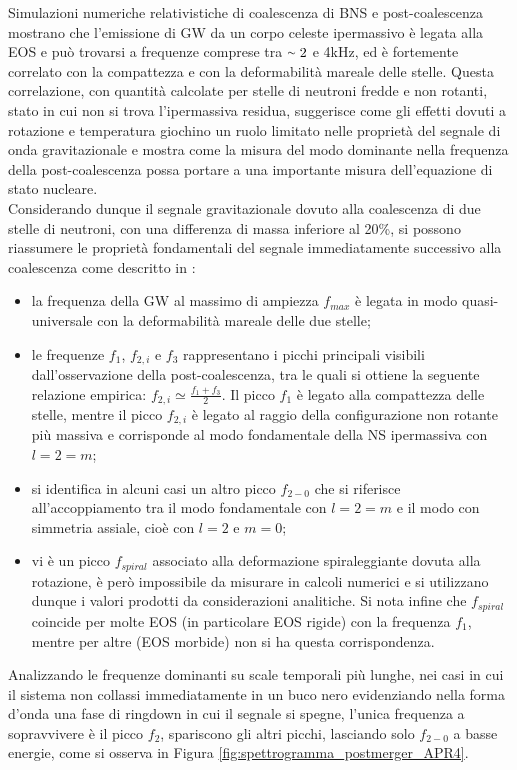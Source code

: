 Simulazioni numeriche relativistiche di coalescenza di BNS e post-coalescenza mostrano che l'emissione di GW da un corpo celeste ipermassivo è legata alla EOS e può trovarsi a frequenze comprese tra $\smallsim2$ e 4kHz, ed è fortemente correlato con la compattezza e con la deformabilità mareale delle stelle. Questa correlazione, con quantità calcolate per stelle di neutroni fredde e non rotanti, stato in cui non si trova l'ipermassiva residua, suggerisce come gli effetti dovuti a rotazione e temperatura giochino un ruolo limitato nelle proprietà del segnale di onda gravitazionale e mostra come la misura del modo dominante nella frequenza della post-coalescenza possa portare a una importante misura dell'equazione di stato nucleare\cite{sarin2020evolution}.\\
Considerando dunque il segnale gravitazionale dovuto alla coalescenza di due stelle di neutroni, con una differenza di massa inferiore al 20\%, si possono riassumere le proprietà fondamentali del segnale immediatamente successivo alla coalescenza come descritto in \cite{Rezzolla_2016}:
\begin{itemize}
	\item la frequenza della GW al massimo di ampiezza $f_{max}$ è legata in modo quasi-universale con la deformabilità mareale delle due stelle;
	\item le frequenze $f_1$, $f_{2,i}$ e $f_3$ rappresentano i picchi principali visibili dall'osservazione della post-coalescenza, tra le quali si ottiene la seguente relazione empirica: $f_{2,i}\simeq\frac{f_1 + f_3}{2}$. Il picco $f_1$ è legato alla compattezza delle stelle, mentre il picco $f_{2,i}$ è legato al raggio della configurazione non rotante più massiva e corrisponde al modo fondamentale della NS ipermassiva con $l=2=m$;
	\item si identifica in alcuni casi un altro picco $f_{2-0}$ che si riferisce all'accoppiamento tra il modo fondamentale con $l=2=m$ e il modo con simmetria assiale, cioè con $l=2$ e $m=0$;
	\item vi è un picco $f_{spiral}$ associato alla deformazione spiraleggiante dovuta alla rotazione, è però impossibile da misurare in calcoli numerici e si utilizzano dunque i valori prodotti da considerazioni analitiche. Si nota infine che $f_{spiral}$ coincide per molte EOS (in particolare EOS rigide) con la frequenza $f_1$, mentre per altre (EOS morbide) non si ha questa corrispondenza.
\end{itemize}

Analizzando le frequenze dominanti su scale temporali più lunghe, nei casi in cui il sistema non collassi immediatamente in un buco nero evidenziando nella forma d'onda una fase di ringdown in cui il segnale si spegne, l'unica frequenza a sopravvivere è il picco $f_2$, spariscono gli altri picchi, lasciando solo $f_{2-0}$ a basse energie, come si osserva in Figura \ref{fig:spettrogramma_postmerger_APR4}.

